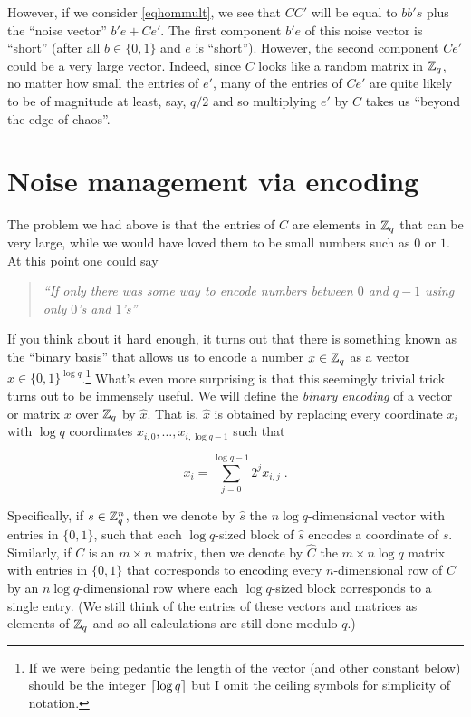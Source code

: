 However, if we consider \eqref{eqhommult}, we see that
\(\ensuremath{\mathit{CC}}'\) will be equal to \(bb's\) plus the ``noise
vector'' \(b'e + Ce'\). The first component \(b'e\) of this noise vector
is ``short'' (after all \(b\in \{0,1\}\) and \(e\) is ``short'').
However, the second component \(Ce'\) could be a very large vector.
Indeed, since \(C\) looks like a random matrix in \({\mathbb{Z}}_q\), no matter
how small the entries of \(e'\), many of the entries of \(Ce'\) are
quite likely to be of magnitude at least, say, \(q/2\) and so
multiplying \(e'\) by \(C\) takes us ``beyond the edge of chaos''.

\section{Noise management via encoding}\label{Noise-management-via-enco}

The problem we had above is that the entries of \(C\) are elements in
\({\mathbb{Z}}_q\) that can be very large, while we would have loved them to be
small numbers such as \(0\) or \(1\). At this point one could say

\begin{quote}
\emph{``If only there was some way to encode numbers between \(0\) and
\(q-1\) using only \(0\)'s and \(1\)'s''}
\end{quote}

If you think about it hard enough, it turns out that there is something
known as the ``binary basis'' that allows us to encode a number
\(x\in{\mathbb{Z}}_q\) as a vector \(\hat{x}\in\{0,1\}^{\log q}\).\footnote{If we
  were being pedantic the length of the vector (and other constant
  below) should be the integer \(\lceil \log q \rceil\) but I omit the ceiling
  symbols for simplicity of notation.} What's even more surprising is
that this seemingly trivial trick turns out to be immensely useful. We
will define the \emph{binary encoding} of a vector or matrix \(x\) over
\({\mathbb{Z}}_q\) by \(\hat{x}\). That is, \(\hat{x}\) is obtained by replacing
every coordinate \(x_i\) with \(\log q\) coordinates
\(x_{i,0},\ldots,x_{i,\log q-1}\) such that

\[x_i = \sum_{j=0}^{\log q-1}2^j x_{i,j} \;. \label{eqbinaryencoding}\]

Specifically, if \(s\in {\mathbb{Z}}_q^n\), then we denote by \(\hat{s}\) the
\(n\log q\)-dimensional vector with entries in \(\{0,1\}\), such that
each \(\log q\)-sized block of \(\hat{s}\) encodes a coordinate of
\(s\). Similarly, if \(C\) is an \(m\times n\) matrix, then we denote by
\(\hat{C}\) the \(m\times n\log q\) matrix with entries in \(\{0,1\}\)
that corresponds to encoding every \(n\)-dimensional row of \(C\) by an
\(n\log q\)-dimensional row where each \(\log q\)-sized block
corresponds to a single entry. (We still think of the entries of these
vectors and matrices as elements of \({\mathbb{Z}}_q\) and so all calculations are
still done modulo \(q\).)

